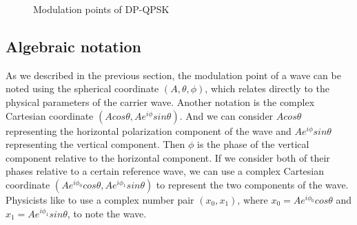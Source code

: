 \documentclass[oneside, letter, 12pt]{book}
\begin{document}
\begin{figure}[h]
\caption{Modulation points of DP-QPSK}
\end{figure}

\subsection{Algebraic notation}
As we described in the previous section, the modulation point of a wave can be noted using the spherical coordinate $(A, \theta, \phi)$, which relates directly to the physical parameters of the carrier wave. Another notation is the complex Cartesian coordinate $(Acos\theta, Ae^{i\phi} sin\theta )$. And we can consider $Acos\theta$ representing the horizontal polarization component of the wave and $Ae^{i\phi} sin\theta$ representing the vertical component. Then $\phi$ is the phase of the vertical component relative to the horizontal component. If we consider both of their phases relative to a certain reference wave, we can use a complex Cartesian coordinate $(Ae^{i\phi_0} cos\theta, Ae^{i\phi_1} sin\theta )$ to represent the two components of the wave. Physicists like to use a complex number pair $(x_0, x_1)$, where $x_0 = Ae^{i\phi_0} cos\theta$ and $x_1 = Ae^{i\phi_1} sin\theta$, to note the wave.
\end{document}
